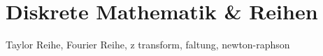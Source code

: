 \chapter{Diskrete Mathematik \& Reihen}

Taylor Reihe, Fourier Reihe, z transform, faltung, newton-raphson


